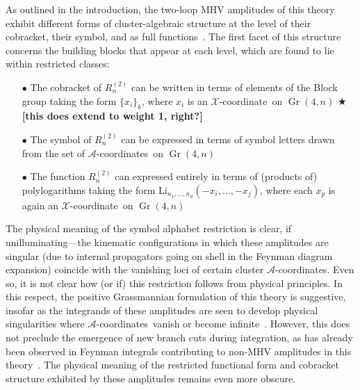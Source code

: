 \documentclass[12pt]{article}
\DeclareMathOperator{\Gr}{Gr}
\def\xcoord{$\mathcal{X}$-coordinate}
\def\acoords{$\mathcal{A}$-coordinates}
\def\draftnote#1{{\color{red} $\bigstar$ }{\bf [#1]}}
\begin{document}
As outlined in the introduction, the two-loop MHV amplitudes of this theory exhibit different forms of cluster-algebraic structure at the level of their cobracket, their symbol, and as full functions~\cite{Golden:2013xva,Golden:2014xqa,Golden:2014xqf,Golden:2014pua}. The first facet of this structure concerns the building blocks that appear at each level, which are found to lie within restricted classes:
\begin{itemize}
\item[$\bullet$] The cobracket of $R^{(2)}_n$ can be written in terms of elements of the Block group taking the form $\{x_i \}_k$, where $x_i$ is an \xcoord\ on $\Gr(4,n)$ \draftnote{this does extend to weight 1, right?}
\item[$\bullet$] The symbol of $R^{(2)}_n$ can be expressed in terms of symbol letters drawn from the set of \acoords\ on $\Gr(4,n)$
\item[$\bullet$] The function $R^{(2)}_n$ can expressed entirely in terms of (products of) polylogarithms taking the form $\text{Li}_{n_1,\dots,n_d}(-x_i,\dots,-x_j)$, where each $x_p$ is again an \xcoord\ on $\Gr(4,n)$
\end{itemize}
The physical meaning of the symbol alphabet restriction is clear, if unilluminating---the kinematic configurations in which these amplitudes are singular (due to internal propagators going on shell in the Feynman diagram expansion) coincide with the vanishing loci of certain cluster \acoords. Even so, it is not clear how (or if) this restriction follows from physical principles. In this respect, the positive Grassmannian formulation of this theory is suggestive, insofar as the integrands of these amplitudes are seen to develop physical singularities where \acoords\ vanish or become infinite~\cite{ArkaniHamed:2012nw}. However, this does not preclude the emergence of new branch cuts during integration, as has already been observed in Feynman integrals contributing to non-MHV amplitudes in this theory~\cite{Bourjaily:2018aeq,Henn:2018cdp}. The physical meaning of the restricted functional form and cobracket structure exhibited by these amplitudes remains even more obscure. 
\end{document}
